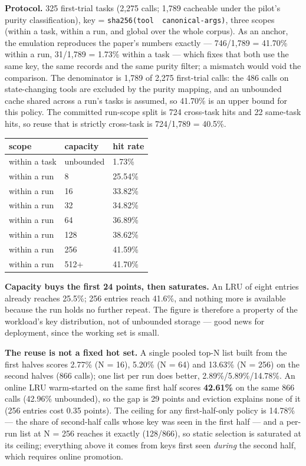 \documentclass[
  11pt,
]{article}
\newcounter{none} %
\begin{document}
\textbf{Protocol.} 325 first-trial tasks (2,275 calls; 1,789 cacheable
under the pilot's purity classification), key =
\texttt{sha256(tool\ \textbar{}\ canonical-args)}, three scopes (within
a task, within a run, and global over the whole corpus). As an anchor,
the emulation reproduces the paper's numbers exactly --- 746/1,789 =
41.70\% within a run, 31/1,789 = 1.73\% within a task --- which fixes
that both use the same key, the same records and the same purity filter;
a mismatch would void the comparison. The denominator is 1,789 of 2,275
first-trial calls: the 486 calls on state-changing tools are excluded by
the purity mapping, and an unbounded cache shared across a run's tasks
is assumed, so 41.70\% is an upper bound for this policy. The committed
run-scope split is 724 cross-task hits and 22 same-task hits, so reuse
that is strictly cross-task is 724/1,789 = 40.5\%.

{\def\LTcaptype{none} %
\begin{longtable}[]{@{}lll@{}}
\toprule\noalign{}
scope & capacity & hit rate \\
\midrule\noalign{}
\endhead
\bottomrule\noalign{}
\endlastfoot
within a task & unbounded & 1.73\% \\
within a run & 8 & 25.54\% \\
within a run & 16 & 33.82\% \\
within a run & 32 & 34.82\% \\
within a run & 64 & 36.89\% \\
within a run & 128 & 38.62\% \\
within a run & 256 & 41.59\% \\
within a run & 512+ & 41.70\% \\
\end{longtable}
}

\textbf{Capacity buys the first 24 points, then saturates.} An LRU of
eight entries already reaches 25.5\%; 256 entries reach 41.6\%, and
nothing more is available because the run holds no further repeat. The
figure is therefore a property of the workload's key distribution, not
of unbounded storage --- good news for deployment, since the working set
is small.

\textbf{The reuse is not a fixed hot set.} A single pooled top-N list
built from the first halves scores 2.77\% (N = 16), 5.20\% (N = 64) and
13.63\% (N = 256) on the second halves (866 calls); one list per run
does better, 2.89\%/5.89\%/14.78\%. An online LRU warm-started on the
same first half scores \textbf{42.61\%} on the same 866 calls (42.96\%
unbounded), so the gap is 29 points and eviction explains none of it
(256 entries cost 0.35 points). The ceiling for any first-half-only
policy is 14.78\% --- the share of second-half calls whose key was seen
in the first half --- and a per-run list at N = 256 reaches it exactly
(128/866), so static selection is saturated at its ceiling; everything
above it comes from keys first seen \emph{during} the second half, which
requires online promotion.
\end{document}
